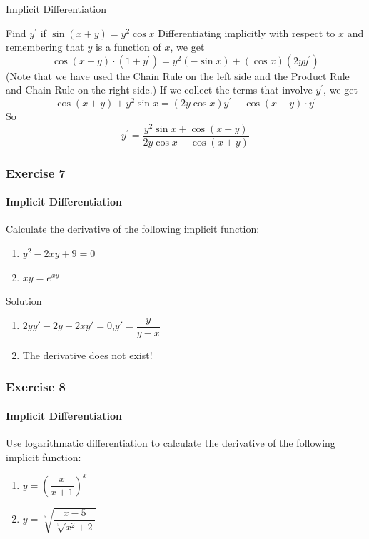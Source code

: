 \begin{frame}{Implicit Differentiation}
    \begin{block}{Find $y^{\prime}$ if $\sin (x+y)=y^{2} \cos x$}
        Differentiating implicitly with respect to $x$ and remembering that $y$ is a function of $x$, we get
        $$
            \cos (x+y) \cdot\left(1+y^{\prime}\right)=y^{2}(-\sin x)+(\cos x)\left(2 y y^{\prime}\right)
        $$
        (Note that we have used the Chain Rule on the left side and the Product Rule and Chain Rule on the right side.) If we collect the terms that involve $y^{\prime}$, we get
        $$
            \cos (x+y)+y^{2} \sin x=(2 y \cos x) y^{\prime}-\cos (x+y) \cdot y^{\prime}
        $$
        So
        $$
            y^{\prime}=\frac{y^{2} \sin x+\cos (x+y)}{2 y \cos x-\cos (x+y)}
        $$
    \end{block}
\end{frame}


\begin{frame}
    \frametitle{Exercise 7}
    \framesubtitle{Implicit Differentiation}
    Calculate the derivative of the following implicit function:
    \begin{enumerate}
        \item $y^{2} - 2xy + 9 = 0$
        \item $xy = e^{xy}$
    \end{enumerate}
\end{frame}


\begin{frame}{Solution}
    \begin{enumerate}
        \item $2yy'-2y-2xy'=0$,$y'=\dfrac{y}{y-x}$
        \item The derivative does not exist!
    \end{enumerate}
\end{frame}


\begin{frame}
    \frametitle{Exercise 8}
    \framesubtitle{Implicit Differentiation}
    Use \alert{logarithmatic differentiation} to calculate the derivative of the following implicit function:
    \begin{enumerate}
        \item $y = (\dfrac{x}{x + 1})^{x}$
        \item $y = \sqrt[5]{\dfrac{x - 5}{\sqrt[5]{x^{2} + 2}}}$
    \end{enumerate}
\end{frame}



